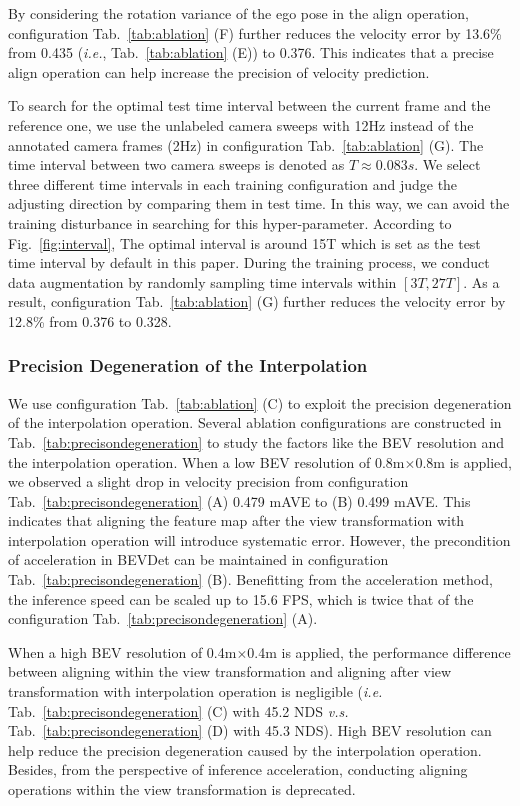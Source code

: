 \documentclass[10pt,twocolumn,letterpaper]{article}
\begin{document}
By considering the rotation variance of the ego pose in the align operation, configuration Tab.~\ref{tab:ablation} (F) further reduces the velocity error by 13.6\% from 0.435 (\textit{i.e.}, Tab.~\ref{tab:ablation} (E)) to 0.376. This indicates that a precise align operation can help increase the precision of velocity prediction.

To search for the optimal test time interval between the current frame and the reference one, we use the unlabeled camera sweeps with 12Hz instead of the annotated camera frames (2Hz) in configuration Tab.~\ref{tab:ablation} (G). The time interval between two camera sweeps is denoted as $T\approx 0.083s$. We select three different time intervals in each training configuration and judge the adjusting direction by comparing them in test time. In this way, we can avoid the training disturbance in searching for this hyper-parameter. According to Fig.~\ref{fig:interval}, The optimal interval is around 15T which is set as the test time interval by default in this paper. During the training process, we conduct data augmentation by randomly sampling time intervals within $[3T,27T]$. As a result, configuration Tab.~\ref{tab:ablation} (G) further reduces the velocity error by 12.8\% from 0.376 to 0.328.

\subsubsection{Precision Degeneration of the Interpolation}
\label{sec:precisondegeneration}
We use configuration Tab.~\ref{tab:ablation} (C) to exploit the precision degeneration of the interpolation operation. Several ablation configurations are constructed in Tab.~\ref{tab:precisondegeneration} to study the factors like the BEV resolution and the interpolation operation. When a low BEV resolution of 0.8m$\times$0.8m is applied, we observed a slight drop in velocity precision from configuration Tab.~\ref{tab:precisondegeneration} (A) 0.479 mAVE to (B) 0.499 mAVE. This indicates that aligning the feature map after the view transformation with interpolation operation will introduce systematic error. However, the precondition of acceleration in BEVDet \cite{BEVDet} can be maintained in configuration Tab.~\ref{tab:precisondegeneration} (B). Benefitting from the acceleration method, the inference speed can be scaled up to 15.6 FPS, which is twice that of the configuration Tab.~\ref{tab:precisondegeneration} (A).

When a high BEV resolution of 0.4m$\times$0.4m is applied, the performance difference between aligning within the view transformation and aligning after view transformation with interpolation operation is negligible (\textit{i.e.} Tab.~\ref{tab:precisondegeneration} (C) with 45.2 NDS \textit{v.s.} Tab.~\ref{tab:precisondegeneration} (D) with 45.3 NDS). High BEV resolution can help reduce the precision degeneration caused by the interpolation operation. Besides, from the perspective of inference acceleration, conducting aligning operations within the view transformation is deprecated.
\end{document}
